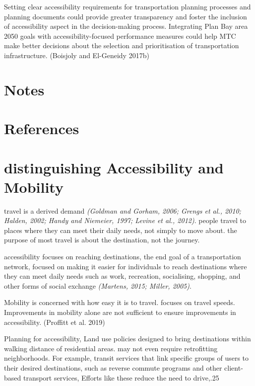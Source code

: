 \documentclass[12pt,]{article}
\begin{document}
Setting clear accessibility requirements for transportation planning
processes and planning documents could provide greater transparency and
foster the inclusion of accessibility aspect in the decision-making
process. Integrating Plan Bay area 2050 goals with accessibility-focused
performance measures could help MTC make better decisions about the
selection and prioritisation of transportation infrastructure. (Boisjoly
and El-Geneidy 2017b)

\hypertarget{notes}{%
\section{Notes}\label{notes}}

\hypertarget{references}{%
\section*{References}\label{references}}

\hypertarget{distinguishing-accessibility-and-mobility}{%
\section{distinguishing Accessibility and
Mobility}\label{distinguishing-accessibility-and-mobility}}

travel is a derived demand \emph{(Goldman and Gorham, 2006; Grengs et
al., 2010; Halden, 2002; Handy and Niemeier, 1997; Levine et al.,
2012)}. people travel to places where they can meet their daily needs,
not simply to move about. the purpose of most travel is about the
destination, not the journey.

accessibility focuses on reaching destinations, the end goal of a
transportation network, focused on making it easier for individuals to
reach destinations where they can meet daily needs such as work,
recreation, socialising, shopping, and other forms of social exchange
\emph{(Martens, 2015; Miller, 2005)}.

Mobility is concerned with how easy it is to travel. focuses on travel
speeds. Improvements in mobility alone are not sufficient to ensure
improvements in accessibility. (Proffitt et al. 2019)

Planning for accessibility, Land use policies designed to bring
destinations within walking distance of residential areas. may not even
require retrofitting neighborhoods. For example, transit services that
link specific groups of users to their desired destinations, such as
reverse commute programs and other client-based transport services,
Efforts like these reduce the need to drive,.25
\end{document}
